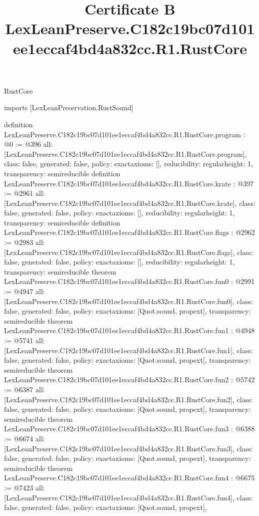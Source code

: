 \begin{lexlean}{RustCore}
\title{Certificate B LexLeanPreserve.C182c19bc07d101ee1eccaf4bd4a832cc.R1.RustCore}
\begin{coremodule}
imports [LexLeanPreservation.RustSound]

definition LexLeanPreserve.C182c19bc07d101ee1eccaf4bd4a832cc.R1.RustCore.program : @0 := @396 {
  all: [LexLeanPreserve.C182c19bc07d101ee1eccaf4bd4a832cc.R1.RustCore.program],
  class: false,
  generated: false,
  policy: exact{axioms: []},
  reducibility: regular{height: 1},
  transparency: semireducible
}
definition LexLeanPreserve.C182c19bc07d101ee1eccaf4bd4a832cc.R1.RustCore.krate : @397 := @2961 {
  all: [LexLeanPreserve.C182c19bc07d101ee1eccaf4bd4a832cc.R1.RustCore.krate],
  class: false,
  generated: false,
  policy: exact{axioms: []},
  reducibility: regular{height: 1},
  transparency: semireducible
}
definition LexLeanPreserve.C182c19bc07d101ee1eccaf4bd4a832cc.R1.RustCore.flags : @2962 := @2983 {
  all: [LexLeanPreserve.C182c19bc07d101ee1eccaf4bd4a832cc.R1.RustCore.flags],
  class: false,
  generated: false,
  policy: exact{axioms: []},
  reducibility: regular{height: 1},
  transparency: semireducible
}
theorem LexLeanPreserve.C182c19bc07d101ee1eccaf4bd4a832cc.R1.RustCore.fun0 : @2991 := @4947 {
  all: [LexLeanPreserve.C182c19bc07d101ee1eccaf4bd4a832cc.R1.RustCore.fun0],
  class: false,
  generated: false,
  policy: exact{axioms: [Quot.sound, propext]},
  transparency: semireducible
}
theorem LexLeanPreserve.C182c19bc07d101ee1eccaf4bd4a832cc.R1.RustCore.fun1 : @4948 := @5741 {
  all: [LexLeanPreserve.C182c19bc07d101ee1eccaf4bd4a832cc.R1.RustCore.fun1],
  class: false,
  generated: false,
  policy: exact{axioms: [Quot.sound, propext]},
  transparency: semireducible
}
theorem LexLeanPreserve.C182c19bc07d101ee1eccaf4bd4a832cc.R1.RustCore.fun2 : @5742 := @6387 {
  all: [LexLeanPreserve.C182c19bc07d101ee1eccaf4bd4a832cc.R1.RustCore.fun2],
  class: false,
  generated: false,
  policy: exact{axioms: [Quot.sound, propext]},
  transparency: semireducible
}
theorem LexLeanPreserve.C182c19bc07d101ee1eccaf4bd4a832cc.R1.RustCore.fun3 : @6388 := @6674 {
  all: [LexLeanPreserve.C182c19bc07d101ee1eccaf4bd4a832cc.R1.RustCore.fun3],
  class: false,
  generated: false,
  policy: exact{axioms: [Quot.sound, propext]},
  transparency: semireducible
}
theorem LexLeanPreserve.C182c19bc07d101ee1eccaf4bd4a832cc.R1.RustCore.fun4 : @6675 := @7423 {
  all: [LexLeanPreserve.C182c19bc07d101ee1eccaf4bd4a832cc.R1.RustCore.fun4],
  class: false,
  generated: false,
  policy: exact{axioms: [Quot.sound, propext]},
}
\end{coremodule}
\end{lexlean}
